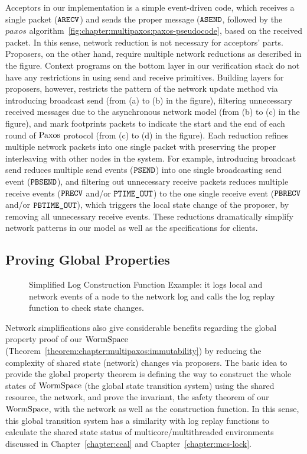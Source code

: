 Acceptors in our implementation is a simple event-driven code, which receives a single packet (${\mathrm{\texttt{ARECV}}}$) and 
sends the proper message (${\mathrm{\texttt{ASEND}}}$, followed by the $paxos$ algorithm~\ref{fig:chapter:multipaxos:paxos-pseudocode}, 
based on the received packet.
In this sense, 
network reduction is not necessary for acceptors' parts. 
Proposers, on the other hand, require multiple network reductions as described in the figure. 
Context programs on the bottom layer in our verification stack do not have any restrictions in using send and receive primitives.
Building layers for proposers,  however, 
restricts the pattern of the network update method 
via introducing broadcast send (from (a) to (b) in the figure), 
filtering unnecessary received messages due to the asynchronous  network model (from (b) to (c) in the figure),
and mark footprints packets to indicate the start and the end of each round of $\mathrm{Paxos}$ protocol (from (c) to (d) in the figure).
Each reduction refines multiple network packets into one single packet with preserving the proper interleaving with other nodes in the system. 
For example, 
introducing broadcast send reduces multiple send events (${\mathrm{\texttt{PSEND}}}$) into one single broadcasting send event (${\mathrm{\texttt{PBSEND}}}$),
and filtering out unnecessary receive packets reduces multiple receive events (${\mathrm{\texttt{PRECV}}}$ and/or ${\mathrm{\texttt{PTIME\_OUT}}}$) 
to the one single receive event (${\mathrm{\texttt{PBRECV}}}$ and/or ${\mathrm{\texttt{PBTIME\_OUT}}}$), which triggers the local state change of the proposer,
by removing all unnecessary receive events. 
These reductions dramatically simplify network patterns in our model as well as the specifications for clients. 


\subsection{Proving Global Properties}
\label{subsec:safety_verification}

\begin{figure}

\caption{Simplified Log Construction Function Example: it logs local and network events of a node to the network log and calls the log replay function to check state changes.}
\label{fig:chapter:multipaxos:spec}
\end{figure}


Network simplifications also give considerable benefits regarding the global property proof of our $\mathrm{WormSpace}$ (Theorem~\ref{theorem:chapter:multipaxos:immutability}) by reducing the complexity of 
shared state (network) changes via proposers.
The basic idea to provide the global property theorem is defining the way to construct the whole states of $\mathrm{WormSpace}$ (the global state transition system) using the shared resource, the network, and prove the invariant, the safety theorem of our $\mathrm{WormSpace}$, with the network as well as the construction function.  
In this sense, this global transition system has a similarity with log replay functions to calculate the shared state status of 
multicore/multithreaded environments discussed in Chapter~\ref{chapter:ccal} and Chapter~\ref{chapter:mcs-lock}.

